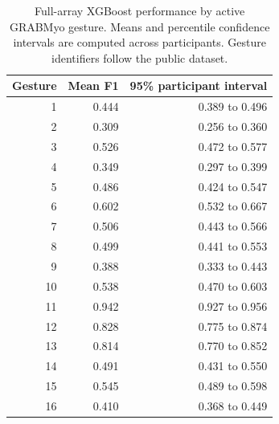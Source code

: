 \begin{table}[htbp]
\centering
\small
\caption{Full-array XGBoost performance by active GRABMyo gesture. Means and percentile confidence intervals are computed across participants. Gesture identifiers follow the public dataset.}
\label{tab:gesture_audit}
\begin{tabular}{rrr}
\toprule
Gesture & Mean F1 & 95\% participant interval \\
\midrule
1 & 0.444 & 0.389 to 0.496 \\
2 & 0.309 & 0.256 to 0.360 \\
3 & 0.526 & 0.472 to 0.577 \\
4 & 0.349 & 0.297 to 0.399 \\
5 & 0.486 & 0.424 to 0.547 \\
6 & 0.602 & 0.532 to 0.667 \\
7 & 0.506 & 0.443 to 0.566 \\
8 & 0.499 & 0.441 to 0.553 \\
9 & 0.388 & 0.333 to 0.443 \\
10 & 0.538 & 0.470 to 0.603 \\
11 & 0.942 & 0.927 to 0.956 \\
12 & 0.828 & 0.775 to 0.874 \\
13 & 0.814 & 0.770 to 0.852 \\
14 & 0.491 & 0.431 to 0.550 \\
15 & 0.545 & 0.489 to 0.598 \\
16 & 0.410 & 0.368 to 0.449 \\
\bottomrule
\end{tabular}
\end{table}
